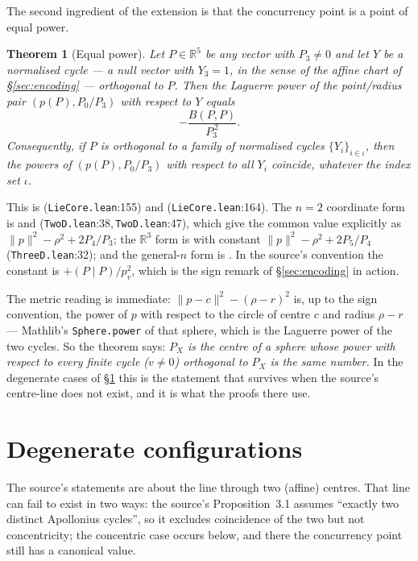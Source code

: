 \documentclass[11pt]{article}
\newtheorem{theorem}{Theorem}
\theoremstyle{definition}
\theoremstyle{remark}
\newcommand{\src}[3]{\texttt{#2}:#3}
\newcommand{\RR}{\mathbb{R}}
\begin{document}
The second ingredient of the extension is that the concurrency point is a point of equal power.

\begin{theorem}[Equal power]\label{thm:equalpower}
Let $P\in\RR^5$ be any vector with $P_3\neq0$ and let $Y$ be a normalised cycle --- a null vector
with $Y_3=1$, in the sense of the affine chart of \S\ref{sec:encoding} --- orthogonal to $P$.
Then the Laguerre power of the point/radius pair $(p(P),P_0/P_3)$ with respect to $Y$ equals
\[
-\frac{B(P,P)}{P_3^{\,2}} .
\]
Consequently, if $P$ is orthogonal to a family of normalised cycles $\{Y_i\}_{i\in\iota}$, then the
powers of $(p(P),P_0/P_3)$ with respect to all $Y_i$ coincide, whatever the index set $\iota$.
\end{theorem}

This is  (\src{PaperK}{LieCore.lean}{155}) and
 (\src{PaperK}{LieCore.lean}{164}). The $n=2$ coordinate form is
 and 
(\src{PaperK}{TwoD.lean}{38},\,\src{PaperK}{TwoD.lean}{47}), which give the common value explicitly as
$\lVert p\rVert^2-\rho^2+2P_4/P_3$; the $\RR^3$ form is  with constant
$\lVert p\rVert^2-\rho^2+2P_5/P_4$ (\src{PaperK}{ThreeD.lean}{32}); and the general-$n$ form is
. In the source's convention the constant is
$+(P\mid P)/p_v^2$, which is the sign remark of \S\ref{sec:encoding} in action.

The metric reading is immediate: $\lVert p-c\rVert^2-(\rho-r)^2$ is, up to the sign convention, the
power of $p$ with respect to the circle of centre $c$ and radius $\rho-r$ --- Mathlib's
\texttt{Sphere.power} of that sphere, which is the Laguerre power of the two cycles. So the theorem says: \emph{$P_X$ is the centre of a sphere whose power with
respect to every finite cycle ($v\neq0$) orthogonal to $P_X$ is the same number.} In the degenerate cases of
\S\ref{sec:degenerate} this is the statement that survives when the source's centre-line does not
exist, and it is what the proofs there use.

\section{Degenerate configurations}\label{sec:degenerate}

The source's statements are about the line through two (affine) centres. That line can fail to exist
in two ways: the source's Proposition~3.1 assumes ``exactly two distinct Apollonius cycles'', so it
excludes coincidence of the two but not concentricity; the concentric case occurs below, and there
the concurrency point still has a canonical value.
\end{document}
